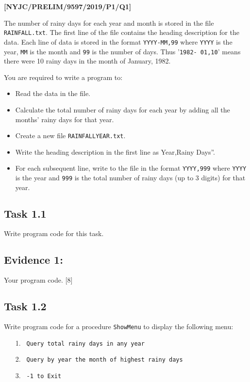 \item \textbf{{[}NYJC/PRELIM/9597/2019/P1/Q1{]} }

The number of rainy days for each year and month is stored in the
file \texttt{RAINFALL.txt}. The first line of the file contains the
heading description for the data. Each line of data is stored in the
format \texttt{YYYY-MM,99} where \texttt{YYYY} is the year, \texttt{MM}
is the month and \texttt{99} is the number of days. Thus '\texttt{1982-
01,10}' means there were 10 rainy days in the month of January, 1982. 

You are required to write a program to: 
\begin{itemize}
\item Read the data in the file. 
\item Calculate the total number of rainy days for each year by adding all
the months\textquoteright{} rainy days for that year. 
\item Create a new file \texttt{RAINFALLYEAR.txt}. 
\item Write the heading description in the first line as \textquotedbl Year,Rainy
Days\textquotedblright . 
\item For each subsequent line, write to the file in the format \texttt{YYYY,999}
where \texttt{YYYY} is the year and \texttt{999} is the total number
of rainy days (up to 3 digits) for that year. 
\end{itemize}

\subsection*{Task 1.1 }

Write program code for this task. 

\subsection*{Evidence 1: }

Your program code. \hfill{}{[}8{]}

\subsection*{Task 1.2 }

Write program code for a procedure \texttt{ShowMenu} to display the
following menu: 
\begin{enumerate}
\item[1.] \texttt{ Query total rainy days in any year}
\item[2.] \texttt{ Query by year the month of highest rainy days }
\item[3.] \texttt{ -1 to Exit}
\end{enumerate}

